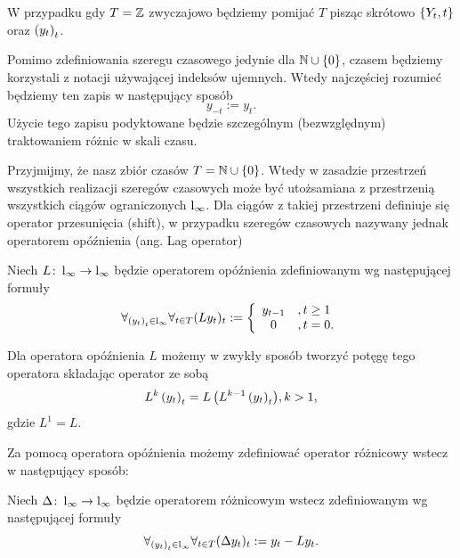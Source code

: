 \documentclass[10pt,a4paper]{book}
\begin{document}
\begin{remark}
W przypadku gdy $T = \mathbb{Z} $ zwyczajowo będziemy pomijać $T$ pisząc skrótowo $\left\lbrace {{Y_t}, {t}} \right\rbrace$ oraz $\left({y_t}\right)_{t}$.
\end{remark}

\begin{remark}
Pomimo zdefiniowania szeregu czasowego jedynie dla $\mathbb{N} \cup \left\lbrace {0} \right\rbrace $, czasem będziemy korzystali z notacji używającej indeksów ujemnych. Wtedy najczęściej rozumieć będziemy ten zapis w następujący sposób
$$
y_{-t} := y_{t}.
$$
Użycie tego zapisu podyktowane będzie szczególnym (bezwzględnym) traktowaniem różnic w skali czasu.
\end{remark}

Przyjmijmy, że nasz zbiór czasów $T = \mathbb{N} \cup \left\lbrace {0} \right\rbrace$. Wtedy w zasadzie przestrzeń wszystkich realizacji szeregów czasowych może być utożsamiana z przestrzenią wszystkich ciągów ograniczonych $\operatorname{l}_{\infty} $. Dla ciągów z takiej przestrzeni definiuje się operator przesunięcia (shift), w przypadku szeregów czasowych nazywany jednak operatorem opóźnienia (ang. Lag operator)

\begin{definition} 
Niech $L \colon \operatorname{l}_{\infty} \to \operatorname{l}_{\infty} $ będzie operatorem opóźnienia zdefiniowanym wg następującej formuły
$$
\forall_{\left( {y_t} \right)_{t}^{} \in \operatorname{l}_{\infty} }  \forall_{t \in T} (L y_t)_t := 
\left\lbrace \begin{array}{cl}
y_{t-1} &, t \geq 1\\
0&, t =0.
\end{array} \right. 
$$
\end{definition}

Dla operatora opóźnienia $L$ możemy w zwykły sposób tworzyć potęgę tego operatora składając operator ze sobą
$$
L^k \left( {y_t} \right)_{t}^{}  = {{L}\left( { L^{k-1} \left( {y_t} \right)_{t}^{} } \right)} , k > 1,
$$
gdzie $L^1 = L$.

Za pomocą operatora opóźnienia możemy zdefiniować operator różnicowy wstecz w następujący sposób:
\begin{definition} 
Niech $\Delta \colon \operatorname{l}_{\infty} \to \operatorname{l}_{\infty}$ będzie operatorem różnicowym wstecz zdefiniowanym wg następującej formuły
$$
\forall_{ \left( {y_t} \right)_{t}^{} \in \operatorname{l}_{\infty} } \forall_{t \in T} (\Delta y_t)_t := y_t - L y_t.
$$
\end{definition}
\end{document}
